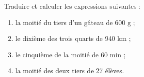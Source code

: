 
\begin{exercice}\label{exosmath-0877}

Traduire et calculer les expressions suivantes :
\begin{enumerate}
    \item
 la moitié du tiers d'un gâteau de 600 g ;
 \item
 le dixième des trois quarts de 940 km ;
 \item
 le cinquième de la moitié de 60 min ;
 \item
 la moitié des deux tiers de 27 élèves.
\end{enumerate}

\end{exercice}
